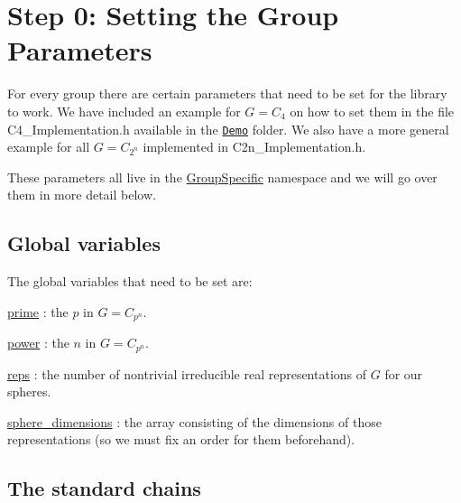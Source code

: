 \hypertarget{use_how}{}\section{Step 0\+: Setting the Group Parameters}\label{use_how}
For every group there are certain parameters that need to be set for the library to work. We have included an example for $G=C_4$ on how to set them in the file {\ttfamily C4\+\_\+\+Implementation.\+h} available in the \href{https://github.com/NickG-Math/Mackey/tree/master/Demo}{\tt Demo} folder. We also have a more general example for all $G=C_{2^n}$ implemented in {\ttfamily C2n\+\_\+\+Implementation.\+h}.

These parameters all live in the \hyperlink{namespaceGroupSpecific}{Group\+Specific} namespace and we will go over them in more detail below.\hypertarget{use_var}{}\subsection{Global variables}\label{use_var}
The global variables that need to be set are\+:


\begin{DoxyItemize}
\item \hyperlink{classGroupSpecific_1_1Variables_a38586ec998bcbfdf325e6cfc6598b54b}{prime} \+: the $p$ in $G=C_{p^n}$.
\item \hyperlink{classGroupSpecific_1_1Variables_ac9bd6be19cc41e6877ee25a2d1c7be80}{power} \+: the $n$ in $G=C_{p^n}$.
\item \hyperlink{classGroupSpecific_1_1Variables_a5504789b0b60050e6ea223fdeb84874a}{reps} \+: the number of nontrivial irreducible real representations of $G$ for our spheres.
\item \hyperlink{classGroupSpecific_1_1Variables_a4746f16736abcf4c705dd8690ec12ca0}{sphere\+\_\+dimensions} \+: the array consisting of the dimensions of those representations (so we must fix an order for them beforehand).
\end{DoxyItemize}\hypertarget{use_fun}{}\subsection{The standard chains}\label{use_fun}

